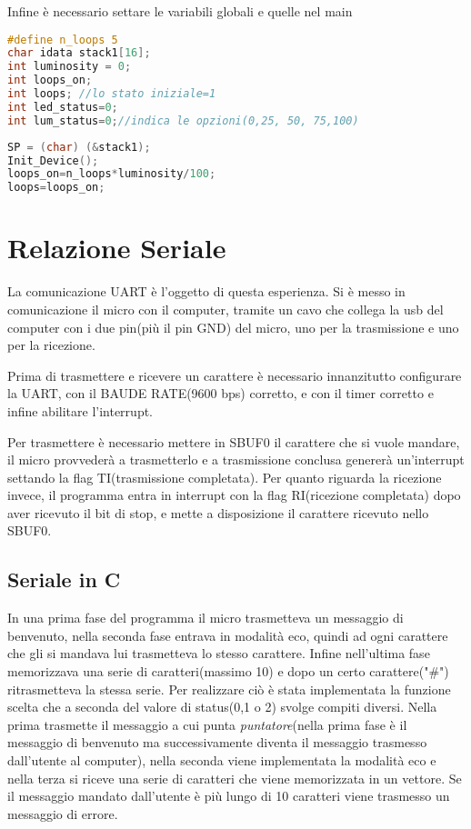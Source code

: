 \documentclass[main.tex]{subfiles}
\begin{document}
Infine è necessario settare le variabili globali e quelle nel main
\begin{lstlisting}[language=C,caption=Variabili globali]
#define n_loops 5
char idata stack1[16];
int luminosity = 0;
int loops_on;
int loops; //lo stato iniziale=1
int led_status=0;
int lum_status=0;//indica le opzioni(0,25, 50, 75,100)
\end{lstlisting}
\begin{lstlisting}[language=C,caption=main]
SP = (char) (&stack1);
Init_Device();
loops_on=n_loops*luminosity/100;
loops=loops_on;
\end{lstlisting}



\section{Relazione Seriale}
La comunicazione UART è l'oggetto di questa esperienza. Si è messo in comunicazione il micro con il computer, tramite un cavo che collega la usb del computer con i due pin(più il pin GND) del micro, uno per la trasmissione e uno per la ricezione.

Prima di trasmettere e ricevere un carattere è necessario innanzitutto configurare la UART, con il BAUDE RATE(9600 bps) corretto, e con il timer corretto e infine abilitare l'interrupt.  

Per trasmettere è necessario mettere in SBUF0 il carattere che si vuole mandare, il micro provvederà a trasmetterlo e a trasmissione conclusa genererà un'interrupt settando la flag TI(trasmissione completata). Per quanto riguarda la ricezione invece, il programma entra in interrupt con la flag RI(ricezione completata) dopo aver ricevuto il bit di stop, e mette a disposizione il carattere ricevuto nello SBUF0.  
\subsection{Seriale in C}

In una prima fase del programma il micro trasmetteva un messaggio di benvenuto, nella seconda fase entrava in modalità eco, quindi ad ogni carattere che gli si mandava lui trasmetteva lo stesso carattere. Infine nell'ultima fase memorizzava una serie di caratteri(massimo 10) e dopo un certo carattere("\#") ritrasmetteva la stessa serie. Per realizzare ciò è stata implementata la funzione scelta che a seconda del valore di status(0,1 o 2) svolge compiti diversi. Nella prima trasmette il messaggio a cui punta \textit{puntatore}(nella prima fase è il messaggio di benvenuto ma successivamente diventa il messaggio trasmesso dall'utente al computer), nella seconda viene implementata la modalità eco e nella terza si riceve una serie di caratteri che viene memorizzata in un vettore. Se il messaggio mandato dall'utente è più lungo di 10 caratteri viene trasmesso un messaggio di errore.
\end{document}
